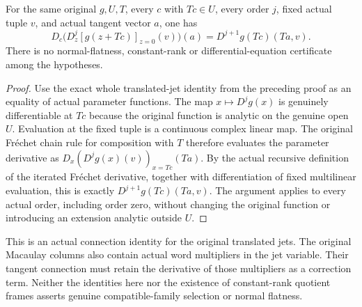\begin{theorem}
\label{hir:actual-tangent-parameter-original-jet-connection}
\leanok
For the same original $g,U,T$, every $c$ with $Tc\in U$, every order
$j$, fixed actual tuple $v$, and actual tangent vector $a$, one has
\[
 D_c\bigl(D_z^j[g(z+Tc)]_{z=0}(v)\bigr)(a)
 =D^{j+1}g(Tc)(Ta,v).
\]
There is no normal-flatness, constant-rank or differential-equation
certificate among the hypotheses.
\end{theorem}
\begin{proof}
Use the exact whole translated-jet identity from the preceding proof
as an equality of actual parameter functions. The map $x\mapsto D^jg(x)$
is genuinely differentiable at $Tc$ because the original function is
analytic on the genuine open $U$. Evaluation at the fixed tuple is a
continuous complex linear map. The original Fr\'echet chain rule for
composition with $T$ therefore evaluates the parameter derivative as
$D_x(D^jg(x)(v))_{x=Tc}(Ta)$. By the actual recursive definition of the
iterated Fr\'echet derivative, together with differentiation of fixed
multilinear evaluation, this is exactly $D^{j+1}g(Tc)(Ta,v)$.
The argument applies to every actual order, including order zero,
without changing the original function or introducing an extension
analytic outside $U$.
\end{proof}

This is an actual connection identity for the original translated jets.
The original Macaulay columns also contain actual word multipliers in
the jet variable. Their tangent connection must retain the derivative
of those multipliers as a correction term. Neither the identities here
nor the existence of constant-rank quotient frames asserts genuine
compatible-family selection or normal flatness.

